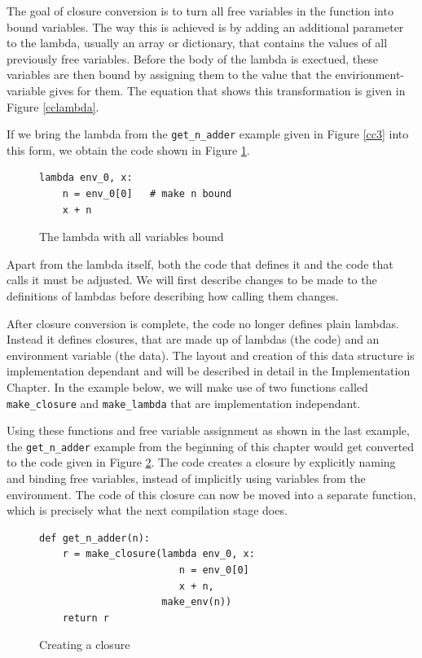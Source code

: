 \documentclass[11pt]{report}
\begin{document}
The goal of closure conversion is to turn all free variables in the function into bound variables. The way this is achieved is by adding an additional parameter to the lambda, usually an array or dictionary, that contains the values of all previously free variables. Before the body of the lambda is exectued, these variables are then bound by assigning them to the value that the envirionment-variable gives for them. The equation that shows this transformation is given in Figure \ref{cclambda}.

If we bring the lambda from the \texttt{get_n_adder} example given in Figure \ref{cc3} into this form, we obtain the code shown in Figure \ref{cc5}.

\begin{figure}[ht]
\begin{lstlisting}
lambda env_0, x: 
    n = env_0[0]   # make n bound
    x + n
\end{lstlisting}
\caption{The lambda with all variables bound}
\label{cc5}
\end{figure}

Apart from the lambda itself, both the code that defines it and the code that calls it must be adjusted. We will first describe changes to be made to the definitions of lambdas before describing how calling them changes.

After closure conversion is complete, the code no longer defines plain lambdas. Instead it defines closures, that are made up of lambdas (the code) and an environment variable (the data). The layout and creation of this data structure is implementation dependant and will be described in detail in the Implementation Chapter. In the example below, we will make use of two functions called \texttt{make_closure} and \texttt{make_lambda} that are implementation independant.

Using these functions and free variable assignment as shown in the last example, the \texttt{get_n_adder} example from the beginning of this chapter would get converted to the code given in Figure \ref{cc6}. The code creates a closure by explicitly naming and binding free variables, instead of implicitly using variables from the environment. The code of this closure can now be moved into a separate function, which is precisely what the next compilation stage does.

\begin{figure}[ht]
\begin{lstlisting}
def get_n_adder(n):
    r = make_closure(lambda env_0, x: 
                        n = env_0[0]
                        x + n, 
                     make_env(n))
    return r
\end{lstlisting}
\caption{Creating a closure}
\label{cc6}
\end{figure}
\end{document}
